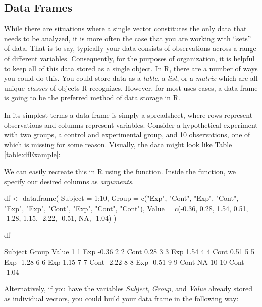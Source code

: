 \subsection{Data Frames}
\label{sec:data_frames}

While there are situations where a single vector constitutes the only data that needs to be analyzed, it is more often the case that you are working with ``sets'' of data.  That is to say, typically your data consists of observations across a range of different variables.  Consequently, for the purposes of organization, it is helpful to keep all of this data stored as a single object.  In R, there are a number of ways you could do this.  You could store data as a \textit{table}, a \textit{list}, or a \textit{matrix} which are all unique \textit{classes} of objects R recognizes. However, for most uses cases, a \gls{data frame} is going to be the preferred method of data storage in R.

In its simplest terms a data frame is simply a spreadsheet, where rows represent observations and columns represent variables. Consider a hypothetical experiment with two groups, a control and experimental group, and 10 observations, one of which is missing for some reason. Visually, the data might look like Table \ref{table:dfExample}: 

\medskip



\noindent
We can easily recreate this in R using the  function. Inside the function, we specify our desired columns as \textit{arguments}.

\begin{inR}
df <- data.frame(
  Subject = 1:10,
  Group = c("Exp", "Cont", "Exp", "Cont", "Exp", "Exp",
            "Cont", "Exp", "Cont", "Cont"),
  Value = c(-0.36,  0.28,  1.54,  0.51, -1.28,  1.15,
            -2.22, -0.51,  NA, -1.04)
)

df
\end{inR}
\begin{outR}
   Subject Group Value
1        1   Exp -0.36
2        2  Cont  0.28
3        3   Exp  1.54
4        4  Cont  0.51
5        5   Exp -1.28
6        6   Exp  1.15
7        7  Cont -2.22
8        8   Exp -0.51
9        9  Cont    NA
10      10  Cont -1.04
\end{outR}

\noindent
Alternatively, if you have the variables \textit{Subject}, \textit{Group}, and \textit{Value} already stored as individual vectors, you could build your data frame in the following way:

